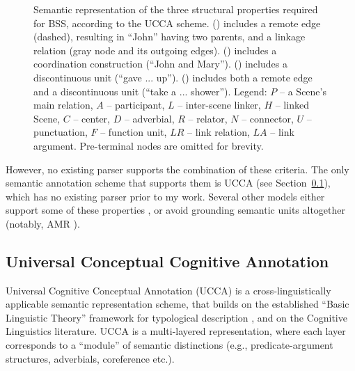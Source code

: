 \documentclass[11pt]{article}
\newcommand{\secref}[1]{Section~\ref{#1}}
\begin{document}
\begin{figure}[ht!]
\begin{subfigure}{\textwidth}
{
  }
  \end{subfigure}
  \caption{\label{fig:examples}
    Semantic representation of the three structural properties
    required for BSS, according to the UCCA scheme.
    () includes a remote edge (dashed),
    resulting in ``John'' having two parents, and a linkage relation (gray node and its outgoing edges).
    () includes a coordination construction (``John and Mary'').
    () includes a discontinuous unit (``gave ... up'').
    () includes both a remote edge and a discontinuous unit (``take a ... shower'').
    Legend: $P$ -- a Scene's main relation, $A$ -- participant,
    $L$ -- inter-scene linker, $H$ -- linked Scene, $C$ -- center, $D$ -- adverbial,
    $R$ -- relator, $N$ -- connector, $U$ -- punctuation, $F$ -- function unit,
    $LR$ -- link relation, $LA$ -- link argument.
    Pre-terminal nodes are omitted for brevity.
  }
\end{figure}

However, no existing parser supports the combination of these criteria.
The only semantic annotation scheme that supports them is UCCA (see \secref{sec:ucca}),
which has no existing parser prior to my work.
Several other models either support some of these properties \cite{oepen2015semeval},
or avoid grounding semantic units altogether
(notably, AMR \cite{banarescu2013abstract}).

\subsection{Universal Conceptual Cognitive Annotation}\label{sec:ucca}
Universal Cognitive Conceptual Annotation (UCCA)
is a cross-linguistically applicable semantic representation scheme,
that builds on the established ``Basic Linguistic Theory'' framework for typological description
\cite{Dixon:10b,Dixon:10a,Dixon:12}, and on the Cognitive Linguistics literature.
UCCA is a multi-layered representation, where each layer corresponds to a ``module'' of
semantic distinctions (e.g., predicate-argument structures, adverbials, coreference etc.).
\end{document}
